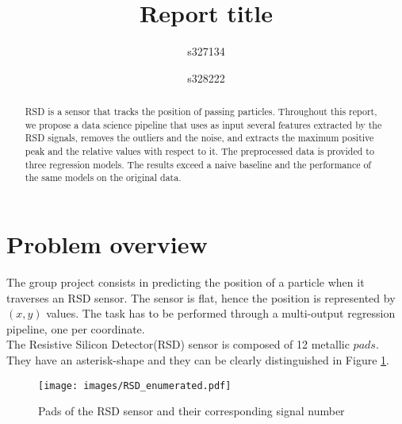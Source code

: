 \documentclass[conference]{IEEEtran}
\begin{document}
\title{Report title}

\author{
s327134 \\
\and
{}
s328222 \\
}

\maketitle

\begin{abstract}
RSD is a sensor that tracks the position of passing particles. Throughout this report, we propose a data science pipeline that uses as input several features extracted by the RSD signals, removes the outliers and the noise, and extracts the maximum positive peak and the relative values with respect to it. The preprocessed data is provided to three regression models. The results exceed a naive baseline and the performance of the same models on the original data.
\end{abstract}

\section{Problem overview}
\label{sec:problemOverview}
The group project consists in predicting the position of a particle when it traverses an RSD sensor. The sensor is flat, hence the position is represented by $(x, y)$ values. 
The task has to be performed through a multi-output regression pipeline, one per coordinate. \\
The Resistive Silicon Detector(RSD) sensor is composed of 12 metallic $pads$. They have an asterisk-shape and they can be clearly distinguished in Figure \ref{fig:rsd}.\\

\begin{figure}[htbp]
\centerline{\texttt{[image: images/RSD\_enumerated.pdf]}}
\caption{Pads of the RSD sensor and their corresponding signal number}
\label{fig:rsd}
\end{figure}
\end{document}
